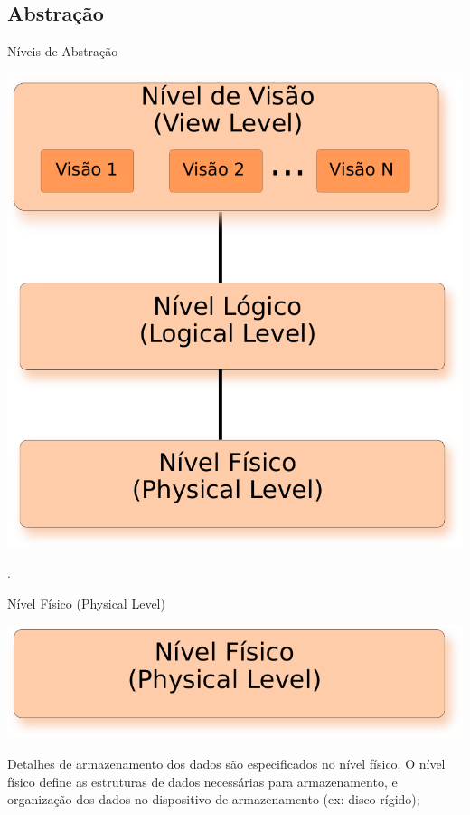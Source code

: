 \documentclass[xcolor=x11names,compress]{beamer}
\begin{document}
\subsection{Abstração}
\begin{frame}{Níveis de Abstração}
 
 \label{lb:abstraction_levels}

\begin{center}

\includegraphics[keepaspectratio,width=.5\textwidth]{sgbd_abstraction_levels}

\end{center}

\vspace*{-2mm}
.

\end{frame}

\begin{frame}{Nível Físico (Physical Level)}

\begin{center}

\includegraphics[keepaspectratio,width=.5\textwidth]{sgbd_physical_level}

\end{center}
 
\begin{block}{}
Detalhes de armazenamento dos dados são especificados no nível físico. O nível físico define as estruturas de dados necessárias para armazenamento, e organização dos dados no dispositivo de armazenamento (ex: disco rígido);
\end{block}

\end{frame}
\end{document}
